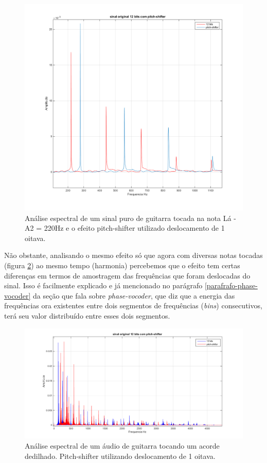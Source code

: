 				\begin{figure}[!ht]
					\centering
					\includegraphics[scale=0.5]{./figuras/12bits-pitch-shifter.png}
					\caption{Análise espectral de um sinal puro de guitarra tocada na nota Lá - A2 = 220Hz e o efeito pitch-shifter utilizado deslocamento de 1 oitava.}
					\label{fig-nota-la-01}
				\end{figure}
				
				Não obstante, analisando o mesmo efeito só que agora com diversas notas tocadas (figura \ref{fig-nota-la-02}) ao mesmo tempo (harmonia) percebemos que o efeito tem certas diferenças em termos de amostragem das frequências que foram deslocadas do sinal. Isso é facilmente explicado e já mencionado no parágrafo \ref{parafrafo-phase-vocoder} da seção que fala sobre \textit{phase-vocoder}, que diz que a energia das frequências ora existentes entre dois segmentos de frequências (\textit{bins}) consecutivos, terá seu valor distribuído entre esses dois segmentos.
				
				\begin{figure}[!ht]
					\centering
					\includegraphics[scale=0.5]{./figuras/simulacoes/12bits-pitch-shift.png}
					\caption{Análise espectral de um áudio de guitarra tocando um acorde dedilhado. Pitch-shifter utilizando deslocamento de 1 oitava.}
					\label{fig-nota-la-02}
				\end{figure}
			
